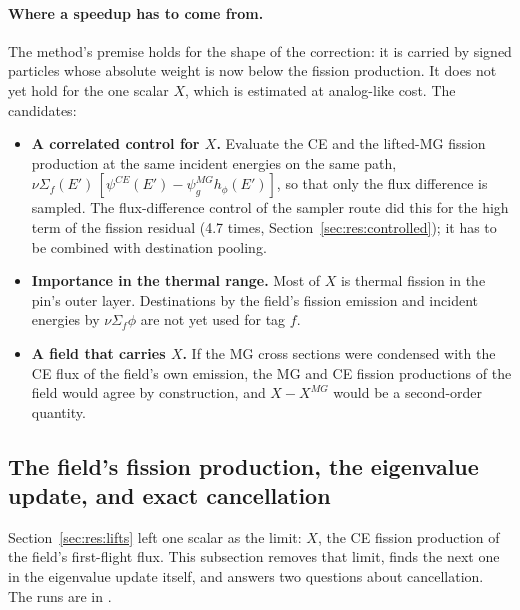 \paragraph{Where a speedup has to come from.} The method's premise holds for the shape of the
correction: it is carried by signed particles whose absolute weight is now below the fission
production. It does not yet hold for the one scalar $X$, which is estimated at analog-like cost. The
candidates:
\begin{itemize}
\item \textbf{A correlated control for $X$.} Evaluate the CE and the lifted-MG fission production
  at the same incident energies on the same path, $\nu\Sigma_f(E')\,[\psi^{CE}(E')-\psi^{MG}_{g}h_\phi(E')]$,
  so that only the flux difference is sampled. The flux-difference control of the sampler route did
  this for the high term of the fission residual (4.7 times, Section~\ref{sec:res:controlled}); it
  has to be combined with destination pooling.
\item \textbf{Importance in the thermal range.} Most of $X$ is thermal fission in the pin's outer
  layer. Destinations by the field's fission emission and incident energies by
  $\nu\Sigma_f\phi$ are not yet used for tag $f$.
\item \textbf{A field that carries $X$.} If the MG cross sections were condensed with the CE flux of
  the field's own emission, the MG and CE fission productions of the field would agree by
  construction, and $X-X^{MG}$ would be a second-order quantity.
\end{itemize}

\subsection{The field's fission production, the eigenvalue update, and exact cancellation}\label{sec:res:X}

Section~\ref{sec:res:lifts} left one scalar as the limit: $X$, the CE fission production of the
field's first-flight flux. This subsection removes that limit, finds the next one in the eigenvalue
update itself, and answers two questions about cancellation. The runs are in
.

